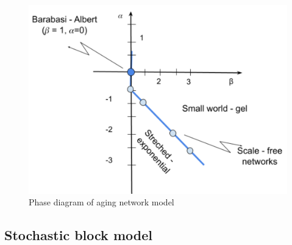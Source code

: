 \begin{figure}[!ht]
	\centering
	\includegraphics[width=0.5\linewidth]{Figures/diagram.png}
	\caption{Phase diagram of aging network model}
	\label{fig:diagram}
\end{figure}

\subsection{Stochastic block model}





